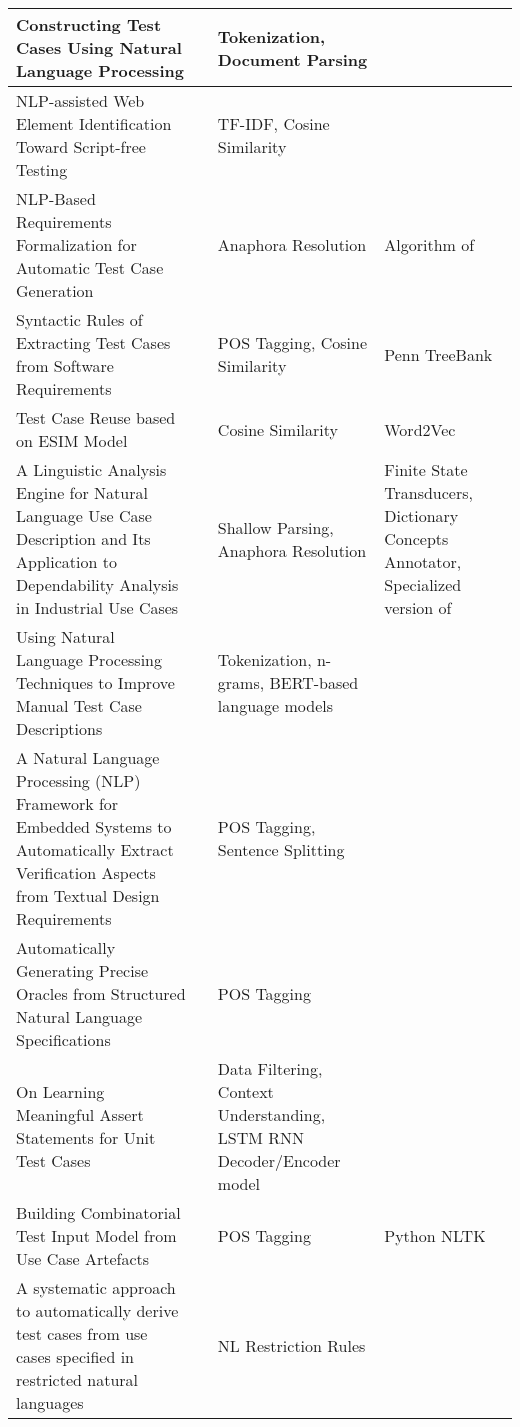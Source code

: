 \begin{longtable}{|p{4cm}|p{2.5cm}|p{4cm}|p{4cm}|}
            \hline Constructing Test Cases Using Natural Language Processing  & \cite{7972390} &  Tokenization, Document Parsing & \\
            \hline NLP-assisted Web Element Identification Toward Script-free Testing & \cite{9609160} & TF-IDF, Cosine Similarity & \\
            \hline NLP-Based Requirements Formalization for Automatic Test Case Generation & \cite{inproceedings} & Anaphora Resolution & Algorithm of \cite{10.5555/203987.203989}\\
            \hline Syntactic Rules of Extracting Test Cases from Software Requirements  & \cite{masuda2016syntactic} & POS Tagging, Cosine Similarity & Penn TreeBank\\
            \hline Test Case Reuse based on ESIM Model  & \cite{chen2021test} & Cosine Similarity & Word2Vec\\
            \hline A Linguistic Analysis Engine for Natural Language Use Case Description and Its Application to Dependability Analysis in Industrial Use Cases
              & \cite{sinha2009linguistic} & Shallow Parsing, Anaphora Resolution & Finite State Transducers, Dictionary Concepts Annotator, Specialized version of \cite{kennedy1996anaphora}\\
            \hline Using Natural Language Processing Techniques to Improve Manual Test Case Descriptions & \cite{viggiato2022using} & Tokenization, n-grams, BERT-based language models & \\
            \hline A Natural Language Processing (NLP) Framework for Embedded Systems to Automatically Extract Verification Aspects from Textual Design Requirements
            & \cite{anwar2020natural} & POS Tagging, Sentence Splitting & \\
            \hline Automatically Generating Precise Oracles from Structured Natural Language Specifications & \cite{8812070} & POS Tagging & \\
            \hline On Learning Meaningful Assert Statements for Unit Test Cases & \cite{9283916} & Data Filtering, Context Understanding, LSTM RNN Decoder/Encoder model & \\
            \hline Building Combinatorial Test Input Model from Use Case Artefacts & \cite{preeti2017building} &  POS Tagging & Python NLTK\\
            \hline A systematic approach to automatically derive test cases from use cases specified in restricted natural languages   & \cite{zhang2014systematic} & NL Restriction Rules & \\

\end{longtable}
